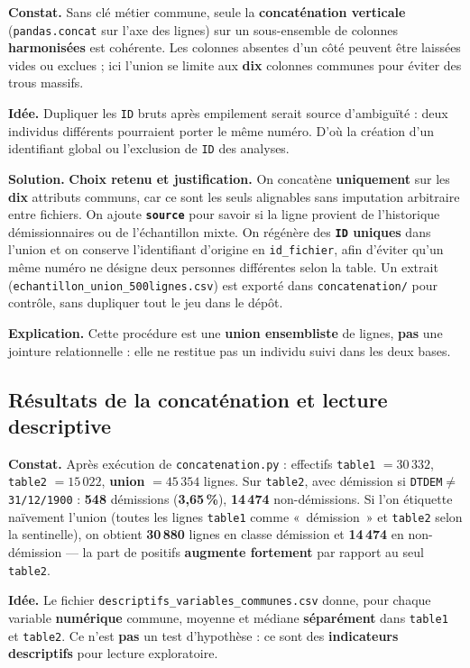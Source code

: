 \documentclass[11pt,a4paper]{article}
\begin{document}
\textbf{Constat.} Sans clé métier commune, seule la \textbf{concaténation verticale} (\texttt{pandas.concat} sur l'axe des lignes) sur un sous-ensemble de colonnes \textbf{harmonisées} est cohérente. Les colonnes absentes d'un côté peuvent être laissées vides ou exclues ; ici l'union se limite aux \textbf{dix} colonnes communes pour éviter des trous massifs.

\textbf{Idée.} Dupliquer les \texttt{ID} bruts après empilement serait source d'ambiguïté : deux individus différents pourraient porter le même numéro. D'où la création d'un identifiant global ou l'exclusion de \texttt{ID} des analyses.

\textbf{Solution.} \textbf{Choix retenu et justification.} On concatène \textbf{uniquement} sur les \textbf{dix} attributs communs, car ce sont les seuls alignables sans imputation arbitraire entre fichiers. On ajoute \textbf{\texttt{source}} pour savoir si la ligne provient de l'historique démissionnaires ou de l'échantillon mixte. On régénère des \textbf{\texttt{ID} uniques} dans l'union et on conserve l'identifiant d'origine en \texttt{id\_fichier}, afin d'éviter qu'un même numéro ne désigne deux personnes différentes selon la table. Un extrait (\texttt{echantillon\_union\_500lignes.csv}) est exporté dans \texttt{concatenation/} pour contrôle, sans dupliquer tout le jeu dans le dépôt.

\textbf{Explication.} Cette procédure est une \textbf{union ensembliste} de lignes, \textbf{pas} une jointure relationnelle : elle ne restitue pas un individu suivi dans les deux bases.

\subsection{Résultats de la concaténation et lecture descriptive}

\textbf{Constat.} Après exécution de \texttt{concatenation.py} : effectifs \texttt{table1} $=30\,332$, \texttt{table2} $=15\,022$, \textbf{union} $=45\,354$ lignes. Sur \texttt{table2}, avec démission si \texttt{DTDEM}$\neq$\texttt{31/12/1900} : \textbf{548} démissions (\textbf{3{,}65\,\%}), \textbf{14\,474} non-démissions. Si l'on étiquette naïvement l'union (toutes les lignes \texttt{table1} comme «~démission~» et \texttt{table2} selon la sentinelle), on obtient \textbf{30\,880} lignes en classe démission et \textbf{14\,474} en non-démission --- la part de positifs \textbf{augmente fortement} par rapport au seul \texttt{table2}.

\textbf{Idée.} Le fichier \texttt{descriptifs\_variables\_communes.csv} donne, pour chaque variable \textbf{numérique} commune, moyenne et médiane \textbf{séparément} dans \texttt{table1} et \texttt{table2}. Ce n'est \textbf{pas} un test d'hypothèse : ce sont des \textbf{indicateurs descriptifs} pour lecture exploratoire.
\end{document}
